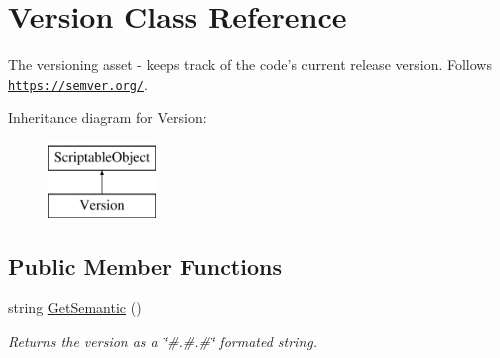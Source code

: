 \hypertarget{class_version}{\section{Version Class Reference}
\label{class_version}
}


The versioning asset -\/ keeps track of the code's current release version. Follows \href{https://semver.org/}{\tt https\-://semver.\-org/}.  


Inheritance diagram for Version\-:\begin{figure}[H]
\begin{center}
\leavevmode
\includegraphics[height=2.000000cm]{class_version}
\end{center}
\end{figure}
\subsection*{Public Member Functions}
\begin{DoxyCompactItemize}
\item 
string \hyperlink{class_version_a7ae17ec2f1d4561e32d9ac5c22332c44}{Get\-Semantic} ()
\begin{DoxyCompactList}\small\item\em Returns the version as a \char`\"{}\#.\#.\#\char`\"{} formated string. \end{DoxyCompactList}\end{DoxyCompactItemize}
